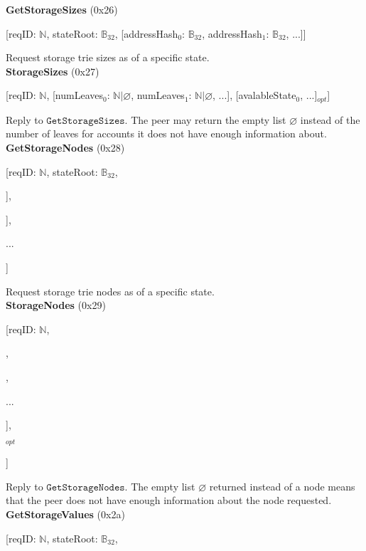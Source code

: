 \documentclass{amsart}
\begin{document}
\textbf{GetStorageSizes} (0x26)

[reqID: $\mathbb{N}$, stateRoot: $\mathbb{B}_{32}$,
[addressHash$_0$: $\mathbb{B}_{32}$, addressHash$_1$: $\mathbb{B}_{32}$, ...]]
\medskip

Request storage trie sizes as of a specific state.\\

\textbf{StorageSizes} (0x27)

[reqID: $\mathbb{N}$,
[numLeaves$_0$: $\mathbb{N} | \varnothing$, numLeaves$_1$: $\mathbb{N} | \varnothing$, ...],
[avalableState$_0$, ...]$_{opt}$]
\medskip

Reply to $\texttt{GetStorageSizes}$.
The peer may return the empty list $\varnothing$ instead of the number of leaves for accounts it does not have enough information about.\\

\textbf{GetStorageNodes} (0x28)

[reqID: $\mathbb{N}$, stateRoot: $\mathbb{B}_{32}$,

\quad [addressHash$^0$: $\mathbb{B}_{32}$, [prefix$^0_0$: $\mathbb{Y}$, prefix$^0_1$: $\mathbb{Y}$, ...]],

\quad [addressHash$^1$: $\mathbb{B}_{32}$, [prefix$^1_0$: $\mathbb{Y}$, prefix$^1_1$: $\mathbb{Y}$, ...]],

\quad ...

]
\medskip

Request storage trie nodes as of a specific state.\\

\textbf{StorageNodes} (0x29)

[reqID: $\mathbb{N}$,

\quad [

\qquad [node$^0_0$: $\mathbb{B}$, node$^0_1$: $\mathbb{B}$, ...],

,

\qquad ...

\quad ],

\quad [avalableState$_0$, ...]$_{opt}$

]
\medskip

Reply to $\texttt{GetStorageNodes}$.
The empty list $\varnothing$ returned instead of a node means that the peer does not have enough information about the node requested.\\

\textbf{GetStorageValues} (0x2a)

[reqID: $\mathbb{N}$, stateRoot: $\mathbb{B}_{32}$,
\end{document}

